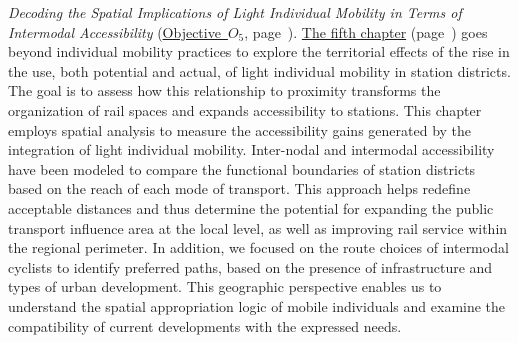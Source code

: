 \textsl{Decoding the Spatial Implications of Light Individual Mobility in Terms of Intermodal Accessibility} (\hyperref[objectif-5]{Objective~\(O_5\)}, page~\pageref{objectif-5}). \hyperref[chap5:titre]{The fifth chapter} (page~\pageref{chap5:titre}) goes beyond individual mobility practices to explore the territorial effects of the rise in the use, both potential and actual, of light individual mobility in station districts. The goal is to assess how this relationship to proximity transforms the organization of rail spaces and expands accessibility to stations. This chapter employs spatial analysis to measure the accessibility gains generated by the integration of light individual mobility. Inter-nodal and intermodal accessibility have been modeled to compare the functional boundaries of station districts based on the reach of each mode of transport. This approach helps redefine acceptable distances and thus determine the potential for expanding the public transport influence area at the local level, as well as improving rail service within the regional perimeter. In addition, we focused on the route choices of intermodal cyclists to identify preferred paths, based on the presence of infrastructure and types of urban development. This geographic perspective enables us to understand the spatial appropriation logic of mobile individuals and examine the compatibility of current developments with the expressed needs.%